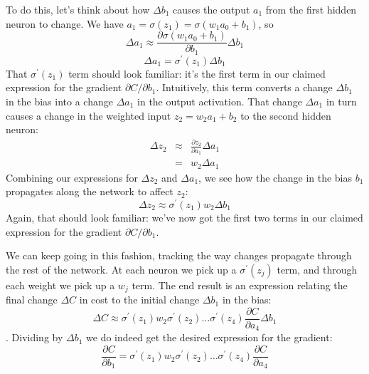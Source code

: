 To do this, let's think about how $\Delta b_{1}$ causes the output $a_1$ from the first hidden neuron to change. We have $a_{1}=\sigma\left(z_{1}\right)=\sigma\left(w_{1} a_{0}+b_{1}\right)$, so  
\begin{equation}
    \Delta a_{1} \approx \frac{\partial \sigma\left(w_{1} a_{0}+b_{1}\right)}{\partial b_{1}} \Delta b_{1}
    \label{eq:c05-115}
    \end{equation}
    \begin{equation}
        \Delta a_{1}  =\sigma^{\prime}\left(z_{1}\right) \Delta b_{1}
        \label{eq:c05-116}
    \end{equation}
That $\sigma^{\prime}\left(z_{1}\right)$ term should look familiar: it's the first term in our claimed expression for the gradient $\partial C / \partial b_{1}$. Intuitively, this term converts a change $\Delta b_{1}$ in the bias into a change  $\Delta a_{1}$ in the output activation. That change  $\Delta a_{1}$ in turn causes a change in the weighted input $z_{2}=w_{2} a_{1}+b_{2}$ to the second hidden neuron: 
\begin{eqnarray}
\Delta z_{2} & \approx &\frac{\partial z_{2}}{\partial a_{1}} \Delta a_{1} \label{eq:c05-117}\\ 
&=&w_{2} \Delta a_{1}  \label{eq:c05-118}
\end{eqnarray}
Combining our expressions for $\Delta z_{2}$ and  $\Delta a_{1}$, we see how the change in the bias $b_1$ propagates along the network to affect $z_2$: 
\begin{equation}
    \Delta z_{2} \approx \sigma^{\prime}\left(z_{1}\right) w_{2} \Delta b_{1}
    \label{eq:c05-119}
    \end{equation}
Again, that should look familiar: we've now got the first two terms in our claimed expression for the gradient $\partial C / \partial b_{1}$.

We can keep going in this fashion, tracking the way changes propagate through the rest of the network. At each neuron we pick up a $\sigma^{\prime}\left(z_{j}\right)$ term, and through each weight we pick up a $w_j$ term. The end result is an expression relating the final change $\Delta C$ in cost to the initial change $\Delta b_{1}$ in the bias: 
\begin{equation}
    \Delta C \approx \sigma^{\prime}\left(z_{1}\right) w_{2} \sigma^{\prime}\left(z_{2}\right) \ldots \sigma^{\prime}\left(z_{4}\right) \frac{\partial C}{\partial a_{4}} \Delta b_{1}
    \label{eq:c05-120}
    \end{equation}.
Dividing by $\Delta b_1$ we do indeed get the desired expression for the gradient: 
\begin{equation}
    \frac{\partial C}{\partial b_{1}}=\sigma^{\prime}\left(z_{1}\right) w_{2} \sigma^{\prime}\left(z_{2}\right) \ldots \sigma^{\prime}\left(z_{4}\right) \frac{\partial C}{\partial a_{4}}
    \label{eq:c05-121}
    \end{equation}




